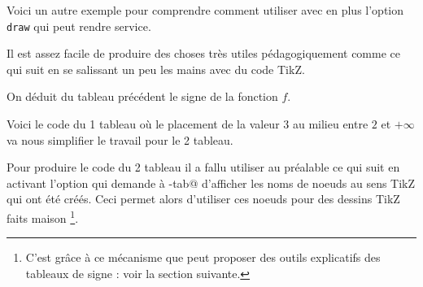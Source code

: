 \documentclass[12pt,a4paper]{article}
\begin{document}















Voici un autre exemple pour comprendre comment utiliser  avec en plus l'option \verb+draw+ qui peut rendre service.






Il est assez facile de produire des choses très utiles pédagogiquement comme ce qui suit en se salissant un peu les mains avec du code TikZ.

\begin{center}
	
\end{center}

On déduit du tableau précédent le signe de la fonction $f$.

\begin{center}
	
\end{center}


Voici le code du 1\ier{} tableau où le placement de la valeur $3$ au milieu entre $2$ et $+\infty$ va nous simplifier le travail pour le 2\ieme{} tableau.

\medskip



Pour produire le code du 2\ieme{} tableau il a fallu utiliser au préalable ce qui suit en activant l'option \verb@help@ qui demande à \verb@tkz-tab@ d'afficher les noms de noeuds au sens TikZ qui ont été créés.
Ceci permet alors d'utiliser ces noeuds pour des dessins TikZ faits maison
\footnote{
    C'est grâce à ce mécanisme que  peut proposer des outils explicatifs des tableaux de signe : voir la section suivante.
}.
	
\end{document}
